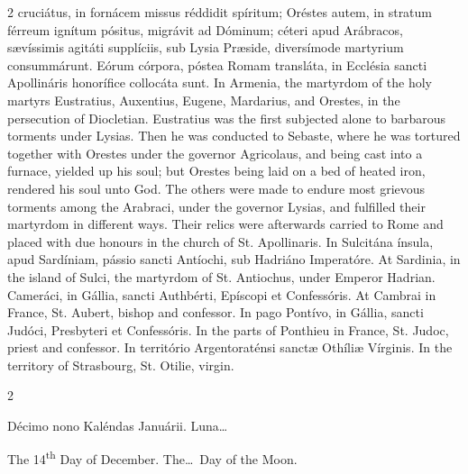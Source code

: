 \begin{paracol}{2}
 cruciátus, in fornácem missus réddidit spíritum; Oréstes autem, in stratum 
 férreum ignítum pósitus, migrávit ad Dóminum; céteri apud Arábracos, 
 sævíssimis agitáti supplíciis, sub Lysia Præside, diversímode martyrium 
 consummárunt. Eórum córpora, póstea Romam transláta, in Ecclésia 
 sancti Apollináris honorífice collocáta sunt.
\switchcolumn
{}
In Armenia, the martyrdom of the 
 holy martyrs Eustratius, Auxentius, Eugene, Mardarius, and Orestes, in the 
 persecution of Diocletian. Eustratius was the first subjected alone to 
 barbarous torments under Lysias. Then he was conducted to Sebaste, 
 where he was tortured together with Orestes under the governor Agricolaus, 
 and being cast into a furnace, yielded up his soul; but Orestes being laid 
 on a bed of heated iron, rendered his soul unto God. The others were 
 made to endure most grievous torments among the Arabraci, under the governor 
 Lysias, and fulfilled their martyrdom in different ways. Their relics 
 were afterwards carried to Rome and placed with due honours in the church of 
 St. Apollinaris.
\switchcolumn*
{}
In Sulcitána ínsula, 
 apud Sardíniam, pássio sancti Antíochi, sub Hadriáno Imperatóre.
\switchcolumn
{}
At Sardinia, in the island of Sulci, 
 the martyrdom of St. Antiochus, under Emperor Hadrian.
\switchcolumn*
{}
Cameráci, in Gállia, 
 sancti Authbérti, Epíscopi et Confessóris.
\switchcolumn
{}
At Cambrai in France, St. Aubert, 
 bishop and confessor.
\switchcolumn*
{}
In pago Pontívo, in 
 Gállia, sancti Judóci, Presbyteri et Confessóris.
\switchcolumn
{}
In the parts of Ponthieu in France, 
 St. Judoc, priest and confessor.
\switchcolumn*
{}
In território 
 Argentoraténsi sanctæ Othíliæ Vírginis.
\switchcolumn
{}
In the territory of Strasbourg, St. 
 Otilie, virgin.
\switchcolumn*
{}
\end{paracol}


\begin{paracol}{2}
\begin{center}{\color{gregoriocolor} Décimo nono Kaléndas Januárii. 
 Luna\dots\ }\end{center}
\switchcolumn
{}
\begin{center}{\color{gregoriocolor} The 
 14\textsuperscript{th} Day of 
 December. The\dots\ Day of the Moon.}\end{center}
\end{paracol}

